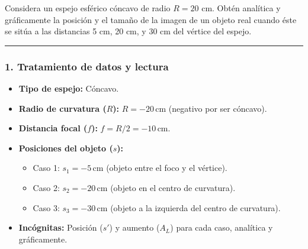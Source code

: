 \begin{cajaenunciado}
Considera un espejo esférico cóncavo de radio $R=20$ cm. Obtén analítica y gráficamente la posición y el tamaño de la imagen de un objeto real cuando éste se sitúa a las distancias 5 cm, 20 cm, y 30 cm del vértice del espejo.
\end{cajaenunciado}
\hrule

\subsubsection*{1. Tratamiento de datos y lectura}
\begin{itemize}
    \item \textbf{Tipo de espejo:} Cóncavo.
    \item \textbf{Radio de curvatura ($R$):} $R = -20 \, \text{cm}$ (negativo por ser cóncavo).
    \item \textbf{Distancia focal ($f$):} $f = R/2 = -10 \, \text{cm}$.
    \item \textbf{Posiciones del objeto ($s$):}
        \begin{itemize}
            \item Caso 1: $s_1 = -5 \, \text{cm}$ (objeto entre el foco y el vértice).
            \item Caso 2: $s_2 = -20 \, \text{cm}$ (objeto en el centro de curvatura).
            \item Caso 3: $s_3 = -30 \, \text{cm}$ (objeto a la izquierda del centro de curvatura).
        \end{itemize}
    \item \textbf{Incógnitas:} Posición ($s'$) y aumento ($A_L$) para cada caso, analítica y gráficamente.
\end{itemize}

